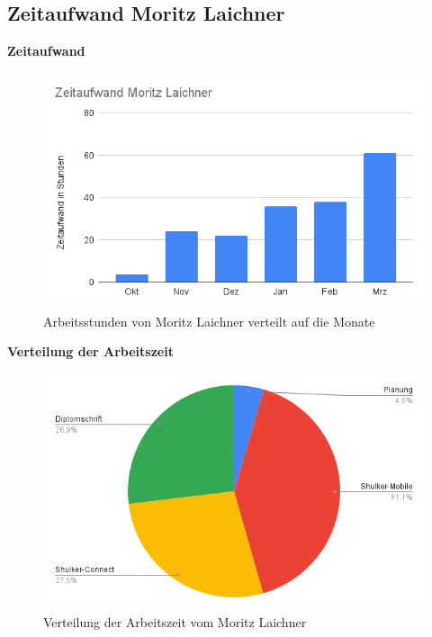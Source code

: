 \subsection{Zeitaufwand Moritz Laichner}
\textbf{Zeitaufwand}
\begin{figure}[H]
    \begin{center}
        \includegraphics[width=.75\textwidth]{images/appendix/ZeitaufwandLaichner.png}
        \caption{Arbeitsstunden von Moritz Laichner verteilt auf die Monate}
    \end{center}
\end{figure}

\textbf{Verteilung der Arbeitszeit}
\begin{figure}[H]
    \begin{center}
        \includegraphics[width=.75\textwidth]{images/appendix/AufteilungLaichner.png}
        \caption{Verteilung der Arbeitszeit vom Moritz Laichner}
    \end{center}
\end{figure}
